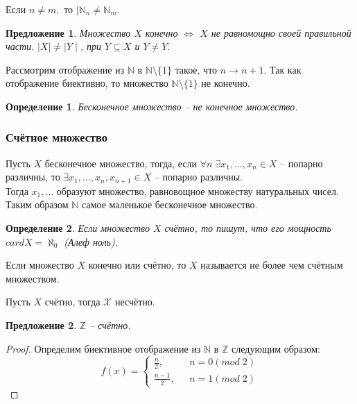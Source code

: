 \documentclass{article}
\newtheorem{Proposition}{Предложение}[section]
\newtheorem{Definition}{Определение}[section]
\begin{document}
Если $n\neq m,$ то $\mid\mathbb{N}_n\neq\mathbb{N}_m.$

\begin{Proposition}
Множество $X$ конечно $\Leftrightarrow$ $X$ не равномощно своей правильной части$.$ $\mid X\mid\neq\mid Y\mid$, при $Y\subseteq X$ и $Y\neq Y.$
\end{Proposition}

Рассмотрим отображение из $\mathbb{N}$ в $\mathbb{N}\setminus\{1\}$ такое, что $n \rightarrow n+1.$ Так как отображение биективно, то множество $\mathbb{N}\setminus\{1\}$ не конечно.
\begin{Definition}
Бесконечное множество -- не конечное множество.
\end{Definition}

\subsubsection{Счётное множество}
Пусть $X$ бесконечное множество, тогда, если $\forall n \; \exists x_1,\ldots, x_n \in X$ -- попарно различны, то $\exists x_1,\ldots, x_n, x_{n+1} \in X$ -- попарно различны.\\

Тогда $x_1,\ldots$ образуют множество, равновощное множеству натуральных чисел. Таким образом $\mathbb{N}$ самое маленькое бесконечное множество.

\begin{Definition}
Если множество $X$ счётно, то пишут, что его мощность $cardX=\aleph_0$ (\textit{Алеф ноль})$.$
\end{Definition}

Если множество $X$ конечно или счётно, то $X$ называется не более чем счётным множеством.

Пусть $X$ счётно, тогда $\mathcal{X}$ несчётно.

\begin{Proposition}
$\mathbb{Z}$ -- счётно.
\end{Proposition}
\begin{proof}
Определим биективное отображение из $\mathbb{N}$ в $\mathbb{Z}$ следующим образом: 
\begin{equation*}
f(x) = 
 \begin{cases}
   \frac{n}{2}, &\text{ $n = 0(mod \; 2) $}\\
   \frac{n-1}{2}, &\text{ $n = 1(mod \; 2)$}
 \end{cases}
\end{equation*}
\end{proof}
\end{document}
